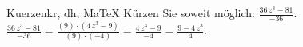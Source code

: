 \begin{MAufgabe}{Kuerzen}{kr, dh, MaTeX}
K\"urzen Sie soweit m\"oglich: $\frac{36\, z^3 - 81}{-36}$.\\ 
\ifLsg\MLoesung
\quad $\frac{36\, z^3 - 81}{-36}=\frac{(9)\cdot(4\, z^3 - 9)}{(9)\cdot(-4)}=\frac{4\, z^3 - 9}{-4}=\frac{9 - 4\, z^3}{4}$.\else\relax\fi
 \end{MAufgabe}